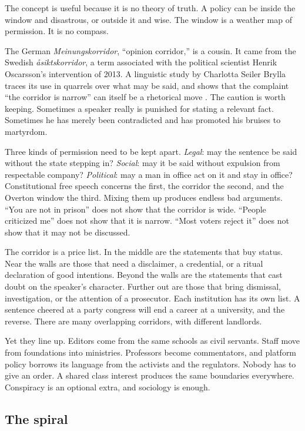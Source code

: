 \documentclass[12pt,a4paper]{book}
\begin{document}
The concept is useful because it is no theory of truth. A policy can be inside the window and disastrous, or outside it and wise. The window is a weather map of permission. It is no compass.

The German \emph{Meinungskorridor}, ``opinion corridor,'' is a cousin. It came from the Swedish \emph{\r{a}siktskorridor}, a term associated with the political scientist Henrik Oscarsson's intervention of 2013. A linguistic study by Charlotta Seiler Brylla traces its use in quarrels over what may be said, and shows that the complaint ``the corridor is narrow'' can itself be a rhetorical move \cite{SeilerBrylla2019}. The caution is worth keeping. Sometimes a speaker really is punished for stating a relevant fact. Sometimes he has merely been contradicted and has promoted his bruises to martyrdom.

Three kinds of permission need to be kept apart. \emph{Legal}: may the sentence be said without the state stepping in? \emph{Social}: may it be said without expulsion from respectable company? \emph{Political}: may a man in office act on it and stay in office? Constitutional free speech concerns the first, the corridor the second, and the Overton window the third. Mixing them up produces endless bad arguments. ``You are not in prison'' does not show that the corridor is wide. ``People criticized me'' does not show that it is narrow. ``Most voters reject it'' does not show that it may not be discussed.

The corridor is a price list. In the middle are the statements that buy status. Near the walls are those that need a disclaimer, a credential, or a ritual declaration of good intentions. Beyond the walls are the statements that cast doubt on the speaker's character. Further out are those that bring dismissal, investigation, or the attention of a prosecutor. Each institution has its own list. A sentence cheered at a party congress will end a career at a university, and the reverse. There are many overlapping corridors, with different landlords.

Yet they line up. Editors come from the same schools as civil servants. Staff move from foundations into ministries. Professors become commentators, and platform policy borrows its language from the activists and the regulators. Nobody has to give an order. A shared class interest produces the same boundaries everywhere. Conspiracy is an optional extra, and sociology is enough.

\subsection{The spiral}
\end{document}
